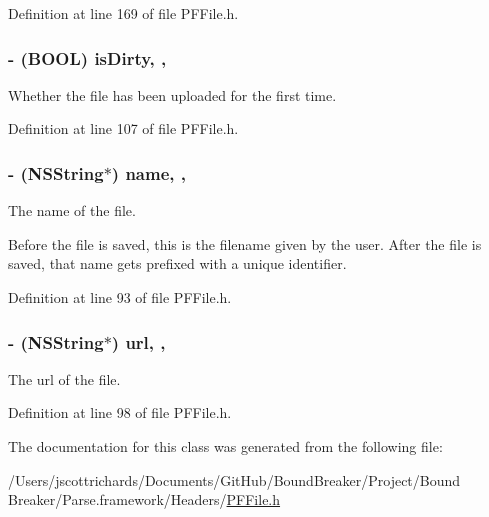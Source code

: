 Definition at line 169 of file P\+F\+File.\+h.

\hypertarget{interface_p_f_file_a7c5c90890ac086b6acead25cb4777e2c}{}
\subsubsection[{is\+Dirty}]{\setlength{\rightskip}{0pt plus 5cm}-\/ (B\+O\+O\+L) is\+Dirty\hspace{0.3cm}{\ttfamily [read]}, {\ttfamily [nonatomic]}, {\ttfamily [assign]}}\label{interface_p_f_file_a7c5c90890ac086b6acead25cb4777e2c}
Whether the file has been uploaded for the first time. 

Definition at line 107 of file P\+F\+File.\+h.

\hypertarget{interface_p_f_file_a7602815ca9a5e7628b2727ba7dd93b22}{}
\subsubsection[{name}]{\setlength{\rightskip}{0pt plus 5cm}-\/ (N\+S\+String$\ast$) name\hspace{0.3cm}{\ttfamily [read]}, {\ttfamily [nonatomic]}, {\ttfamily [copy]}}\label{interface_p_f_file_a7602815ca9a5e7628b2727ba7dd93b22}
The name of the file.

Before the file is saved, this is the filename given by the user. After the file is saved, that name gets prefixed with a unique identifier. 

Definition at line 93 of file P\+F\+File.\+h.

\hypertarget{interface_p_f_file_ada906196949937fe800cc0cab2bc10e4}{}
\subsubsection[{url}]{\setlength{\rightskip}{0pt plus 5cm}-\/ (N\+S\+String$\ast$) url\hspace{0.3cm}{\ttfamily [read]}, {\ttfamily [nonatomic]}, {\ttfamily [copy]}}\label{interface_p_f_file_ada906196949937fe800cc0cab2bc10e4}
The url of the file. 

Definition at line 98 of file P\+F\+File.\+h.



The documentation for this class was generated from the following file\+:\begin{DoxyCompactItemize}
\item 
/\+Users/jscottrichards/\+Documents/\+Git\+Hub/\+Bound\+Breaker/\+Project/\+Bound Breaker/\+Parse.\+framework/\+Headers/\hyperlink{_p_f_file_8h}{P\+F\+File.\+h}\end{DoxyCompactItemize}
